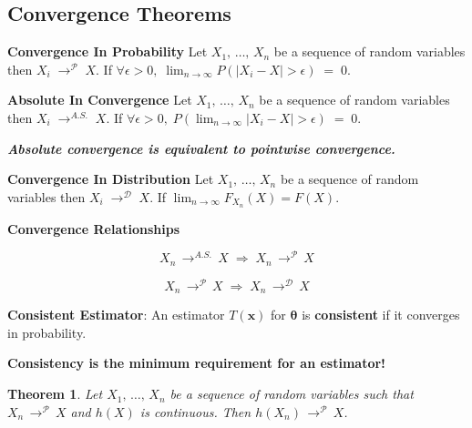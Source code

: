 \documentclass[10pt]{article}
\newtheorem{theorem}{Theorem}
\numberwithin{equation}{section}
\begin{document}
\subsection{Convergence Theorems}

\noindent
\textbf{Convergence In Probability}
Let $X_1, \, \ldots, \, X_n$ be a sequence of random variables then $X_{i} \; \rightarrow^{\mathcal{P}} \; X$. If $\forall \epsilon > 0, \; \lim_{n \rightarrow \infty} P(\vert X_i - X \vert > \epsilon ) \; = \; 0$.

\vspace{2mm}

\noindent
\textbf{Absolute In Convergence}
Let $X_1, \, \ldots, \, X_n$ be a sequence of random variables then $X_{i} \; \rightarrow^{A.S.} \; X$. If $\forall \epsilon > 0, \;  P(\lim_{n \rightarrow \infty}\vert X_i - X \vert > \epsilon ) \; = \; 0$.


\vspace{2mm}

\noindent
\textbf{\textit{Absolute convergence is equivalent to pointwise convergence.}}


\vspace{2mm}

\noindent
\textbf{Convergence In Distribution}
Let $X_1, \, \ldots, \, X_n$ be a sequence of random variables then $X_{i} \; \rightarrow^{\mathcal{D}} \; X$. If $\lim_{n \rightarrow \infty} F_{X_{n}}(X) = F(X)$.

\vspace{2mm}
\textbf{Convergence Relationships}


$$ X_{n} \, \rightarrow^{A.S.} \, X \; \Rightarrow \; X_{n} \, \rightarrow^{\mathcal{P}} \, X $$

$$ X_{n} \, \rightarrow^{\mathcal{P}} \, X \; \Rightarrow \; X_{n} \, \rightarrow^{\mathcal{D}} \, X$$

\vspace{2mm}

\noindent
\textbf{Consistent Estimator}: An estimator $T(\textbf{x})$ for $\boldsymbol \theta$ is \textbf{consistent}  if it converges in probability.


\vspace{2mm}

\textbf{Consistency is the minimum requirement for an estimator!}


\vspace{2mm}

\noindent
\begin{theorem}
Let $X_1, \, \ldots, \, X_n$ be a sequence of random variables such that $X_{n} \, \rightarrow^{\mathcal{P}} \, X$ and $h(X)$ is continuous.  Then $h(X_n) \, \rightarrow^{\mathcal{P}} \, X$.
\end{theorem}
\end{document}
